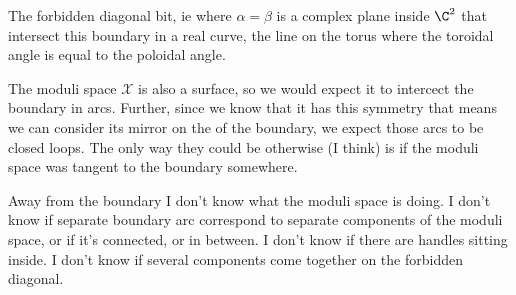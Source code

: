 \documentclass{article}
\begin{document}
The forbidden diagonal bit, ie where $α=β$ is a complex plane inside $\C^2$ that intersect this boundary in a real curve, the line on the torus where the toroidal angle is equal to the poloidal angle.

The moduli space $\mathcal{X}$ is also a surface, so we would expect it to intercect the boundary in arcs. Further, since we know that it has this symmetry that means we can consider its mirror on the of the boundary, we expect those arcs to be closed loops. The only way they could be otherwise (I think) is if the moduli space was tangent to the boundary somewhere.

Away from the boundary I don't know what the moduli space is doing. I don't know if separate boundary arc correspond to separate components of the moduli space, or if it's connected, or in between. I don't know if there are handles sitting inside. I don't know if several components come together on the forbidden diagonal.
\end{document}
